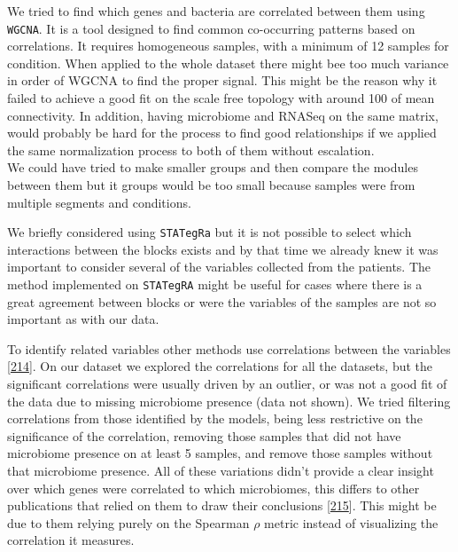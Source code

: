 \documentclass[
  a4paper,
]{book}
\begin{document}
We tried to find which genes and bacteria are correlated between them using \texttt{WGCNA}.
It is a tool designed to find common co-occurring patterns based on correlations.
It requires homogeneous samples, with a minimum of 12 samples for condition.
When applied to the whole dataset there might bee too much variance in order of WGCNA to find the proper signal.
This might be the reason why it failed to achieve a good fit on the scale free topology with around 100 of mean connectivity.
In addition, having microbiome and RNASeq on the same matrix, would probably be hard for the process to find good relationships if we applied the same normalization process to both of them without escalation.\\
We could have tried to make smaller groups and then compare the modules between them but it groups would be too small because samples were from multiple segments and conditions.

We briefly considered using \texttt{STATegRa} but it is not possible to select which interactions between the blocks exists and by that time we already knew it was important to consider several of the variables collected from the patients.
The method implemented on \texttt{STATegRA} might be useful for cases where there is a great agreement between blocks or were the variables of the samples are not so important as with our data.

To identify related variables other methods use correlations between the variables {[}\protect\hyperlink{ref-vila-casadesuxfas2016}{214}{]}.
On our dataset we explored the correlations for all the datasets, but the significant correlations were usually driven by an outlier, or was not a good fit of the data due to missing microbiome presence (data not shown).
We tried filtering correlations from those identified by the models, being less restrictive on the significance of the correlation, removing those samples that did not have microbiome presence on at least 5 samples, and remove those samples without that microbiome presence.
All of these variations didn't provide a clear insight over which genes were correlated to which microbiomes, this differs to other publications that relied on them to draw their conclusions {[}\protect\hyperlink{ref-huxe4sler2017}{215}{]}.
This might be due to them relying purely on the Spearman \(\rho\) metric instead of visualizing the correlation it measures.
\end{document}
